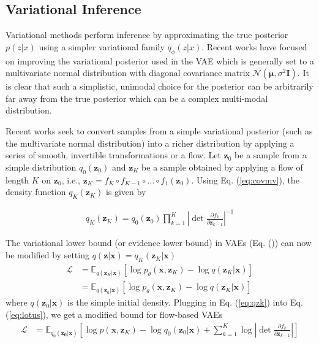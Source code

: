 \documentclass[runningheads]{llncs}
\begin{document}
\subsection{Variational Inference}
Variational methods perform inference by approximating the true posterior $p(z|x)$ using a simpler variational family $q_{\phi}(z|x)$. Recent works have focused on improving the variational posterior used in the VAE which is generally set to a multivariate normal distribution with diagonal covariance matrix $\mathcal{N}(\bm{\mu}, \sigma^2\mathbf{I})$. It is clear that such a simplistic, unimodal choice for the posterior can be arbitrarily far away from the true posterior which can be a complex multi-modal distribution. 

Recent works seek to convert samples from a simple variational posterior (such as the multivariate normal distribution) into a richer distribution by applying a series of smooth, invertible transformations or a flow. Let $\mathbf{z}_0$ be a sample from a simple distribution $q_0(\mathbf{z}_0)$ and $\mathbf{z}_K$ be a sample obtained by applying a flow of length $K$ on $\mathbf{z}_0$, i.e., $\mathbf{z}_K = f_K \circ f_{K-1} \circ \dots \circ f_1 (\mathbf{z}_0)$. Using Eq. (\ref{eq:covmv}), the density function $q_K(\mathbf{z}_K)$ is given by

\begin{align}
q_K(\mathbf{z}_K) = q_0(\mathbf{z}_0)\prod_{k=1}^K\left|\det \frac{\partial f_k}{\partial \mathbf{z}_{k-1}}\right|^{-1}\label{eq:qzk}
\end{align}

The variational lower bound (or evidence lower bound) in VAEs (Eq. ()) can now be modified by setting $q(\mathbf{z}|\mathbf{x}) = q_K(\mathbf{z}_K|\mathbf{x})$
\begin{align}
\mathcal{L} &= \mathbb{E}_{q(\mathbf{z}_K|\mathbf{x})}\left[\log p_\theta(\mathbf{x}, \mathbf{z}_K) - \log q(\mathbf{z}_K|\mathbf{x})\right]\\
&= \mathbb{E}_{q(\mathbf{z}_0|\mathbf{x})}\left[\log p_\theta(\mathbf{x}, \mathbf{z}_K) - \log q(\mathbf{z}_K|\mathbf{x})\right]\label{eq:lotus}
\end{align}
where $q(\mathbf{z}_0|\mathbf{x})$ is the simple initial density. Plugging in Eq. (\ref{eq:qzk}) into Eq. (\ref{eq:lotus}), we get a modified bound for flow-based VAEs
\begin{align}
\mathcal{L} &= \mathbb{E}_{q_0(\mathbf{z_0}|\mathbf{x})}\left[\log p(\mathbf{x},\mathbf{z}_K) - \log q_0(\mathbf{z}_0|\mathbf{x}) + \sum_{k=1}^K\log\left|\det \frac{\partial f_k}{\partial \mathbf{z}_{k-1}}\right| \right]
\end{align}
\end{document}
